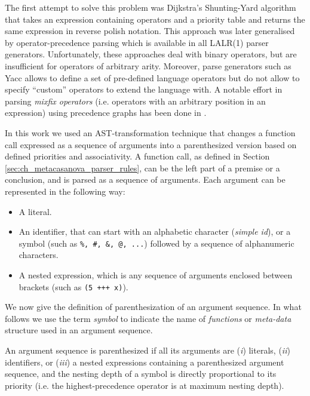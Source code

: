 The first attempt to solve this problem was Dijkstra's Shunting-Yard algorithm \cite{dijkstra1961shuntingyard} that takes an expression containing operators and a priority table and returns the same expression in reverse polish notation. This approach was later generalised by operator-precedence parsing which is available in all LALR(1) parser generators. Unfortunately, these approaches deal with binary operators, but are insufficient for operators of arbitrary arity. Moreover, parse generators such as Yacc allows to define a set of pre-defined language operators but do not allow to specify ``custom'' operators to extend the language with. A notable effort in parsing \textit{mixfix operators} (i.e. operators with an arbitrary position in an expression) using precedence graphs has been done in \cite{danielsson2008parsing}.

In this work we used an AST-transformation technique that changes a function call expressed as a sequence of arguments into a parenthesized version based on defined priorities and associativity. A function call, as defined in Section \ref{sec:ch_metacasanova_parser_rules}, can be the left part of a premise or a conclusion, and is parsed as a sequence of arguments. Each argument can be represented in the following way:

\begin{itemize}[noitemsep]
	\item A literal.
	\item An identifier, that can start with an alphabetic character (\textit{simple id}), or a symbol (such as \texttt{\%, \#, \&, @, ...}) followed by a sequence of alphanumeric characters.
	\item A nested expression, which is any sequence of arguments enclosed between brackets (such as \texttt{(5 +++ x)}).	
\end{itemize}

We now give the definition of parenthesization of an argument sequence. In what follows we use the term \textit{symbol} to indicate the name of \textit{functions} or \textit{meta-data} structure used in an argument sequence.

\begin{definition}
	\label{def:ch_metacasanova_parenthesization}
	An argument sequence is parenthesized if all its arguments are (\textit{i}) literals, (\textit{ii}) identifiers, or (\textit{iii}) a nested expressions containing a parenthesized argument sequence, and the nesting depth of a symbol is directly proportional to its priority (i.e. the highest-precedence operator is at maximum nesting depth).
\end{definition}

